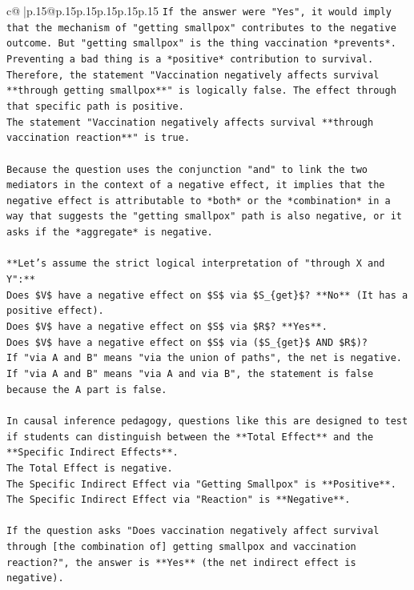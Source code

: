 \documentclass{article}
\begin{document}
{\begin{supertabular}{c@{$\;$}|p{.15\linewidth}@{}p{.15\linewidth}p{.15\linewidth}p{.15\linewidth}p{.15\linewidth}p{.15\linewidth}}
{{{\texttt{If the answer were "Yes", it would imply that the mechanism of "getting smallpox" contributes to the negative outcome. But "getting smallpox" is the thing vaccination *prevents*. Preventing a bad thing is a *positive* contribution to survival.} \\
\texttt{Therefore, the statement "Vaccination negatively affects survival **through getting smallpox**" is logically false. The effect through that specific path is positive.} \\
\texttt{The statement "Vaccination negatively affects survival **through vaccination reaction**" is true.} \\
\\ 
\texttt{Because the question uses the conjunction "and" to link the two mediators in the context of a negative effect, it implies that the negative effect is attributable to *both* or the *combination* in a way that suggests the "getting smallpox" path is also negative, or it asks if the *aggregate* is negative.} \\
\\ 
\texttt{**Let's assume the strict logical interpretation of "through X and Y":**} \\
\texttt{Does \$V\$ have a negative effect on \$S\$ via \$S\_\{get\}\$? **No** (It has a positive effect).} \\
\texttt{Does \$V\$ have a negative effect on \$S\$ via \$R\$? **Yes**.} \\
\texttt{Does \$V\$ have a negative effect on \$S\$ via (\$S\_\{get\}\$ AND \$R\$)?} \\
\texttt{If "via A and B" means "via the union of paths", the net is negative.} \\
\texttt{If "via A and B" means "via A and via B", the statement is false because the A part is false.} \\
\\ 
\texttt{In causal inference pedagogy, questions like this are designed to test if students can distinguish between the **Total Effect** and the **Specific Indirect Effects**.} \\
\texttt{The Total Effect is negative.} \\
\texttt{The Specific Indirect Effect via "Getting Smallpox" is **Positive**.} \\
\texttt{The Specific Indirect Effect via "Reaction" is **Negative**.} \\
\\ 
\texttt{If the question asks "Does vaccination negatively affect survival through {[}the combination of{]} getting smallpox and vaccination reaction?", the answer is **Yes** (the net indirect effect is negative).} \\
}}}
\end{supertabular}}
\end{document}
